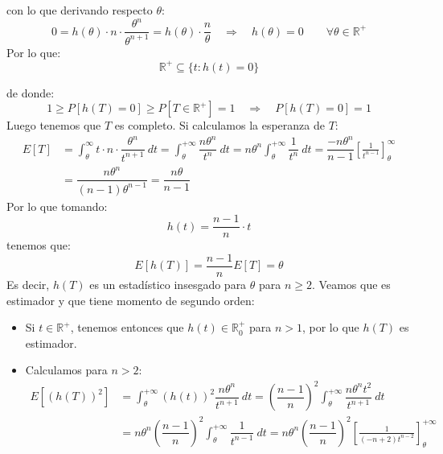 \begin{ejercicio}
    con lo que derivando respecto $\theta$:
    \begin{equation*}
        0 = h(\theta) \cdot n \cdot \dfrac{\theta^n}{\theta^{n+1}} = h(\theta)\cdot \dfrac{n}{\theta} \quad \Longrightarrow \quad  h(\theta) = 0 \qquad \forall \theta\in \mathbb{R}^+
    \end{equation*}
    Por lo que:
    \begin{equation*}
        \mathbb{R}^+ \subseteq \{t:h(t) = 0\}
    \end{equation*}

    de donde:
    \begin{equation*}
        1 \geq P[h(T) = 0] \geq P[T\in \mathbb{R}^+] = 1 \quad \Longrightarrow \quad P[h(T)=0] = 1
    \end{equation*}
    Luego tenemos que $T$ es completo. Si calculamos la esperanza de $T$:
    \begin{align*}
        E[T] &= \int_{\theta}^{\infty} t\cdot n\cdot \dfrac{\theta^n}{t^{n+1}}~dt  = \int_{\theta}^{+\infty} \dfrac{n\theta^n}{t^n}~dt  = n\theta^n \int_{\theta}^{+\infty} \dfrac{1}{t^n}~dt  = \dfrac{-n\theta^n}{n-1} \left[\frac{1}{t^{n-1}}\right]_\theta^\infty \\
             &= \dfrac{n\theta^n}{(n-1)\theta^{n-1}} = \dfrac{n\theta}{n-1}
    \end{align*}
    Por lo que tomando:
    \begin{equation*}
        h(t) = \dfrac{n-1}{n}\cdot t
    \end{equation*}
    tenemos que:
    \begin{equation*}
        E[h(T)] = \dfrac{n-1}{n}E[T] = \theta
    \end{equation*}
    Es decir, $h(T)$ es un estadístico insesgado para $\theta$ para $n\geq 2$. Veamos que es estimador y que tiene momento de segundo orden:
    \begin{itemize}
        \item Si $t\in \mathbb{R}^+$, tenemos entonces que $h(t) \in \mathbb{R}^+_0$ para $n>1$, por lo que $h(T)$ es estimador.
        \item Calculamos para $n>2$:
            \begin{align*}
                E[{(h(T))}^{2}] &= \int_{\theta}^{+\infty} {(h(t))}^{2}\dfrac{n\theta^n}{t^{n+1}}~dt  = {\left(\dfrac{n-1}{n}\right)}^{2}\int_{\theta}^{+\infty} \dfrac{n\theta^n t^2}{t^{n+1}}~dt  \\ 
                                &= n\theta^n {\left(\dfrac{n-1}{n}\right)}^{2}\int_{\theta}^{+\infty} \dfrac{1}{t^{n-1}}~dt  = n\theta^n {\left(\dfrac{n-1}{n}\right)}^{2} \left[\frac{1}{(-n+2)t^{n-2}}\right]_\theta^{+\infty} \\

\end{align*}
\end{itemize}
\end{ejercicio}
